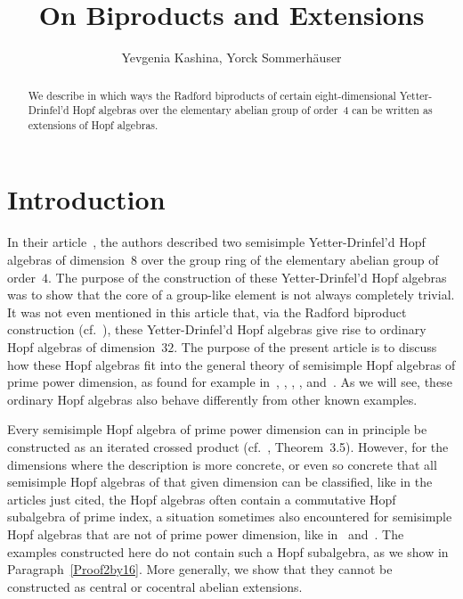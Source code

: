 \documentclass{article}
\title{On Biproducts and Extensions}
\author{Yevgenia Kashina, Yorck Sommerh\"auser}
\date{}
\numberwithin{equation}{section}
\theoremstyle{definition}
\theoremstyle{break}
\newcommand{\1}{{(1)}}
\newcommand{\2}{{(2)}}
\newcommand{\3}{{(3)}}
\begin{document}
\maketitle

\begin{abstract}
\noindent
We describe in which ways the Radford biproducts of certain eight-dimen\-sional Yetter-Drinfel'd Hopf algebras over the elementary abelian group of order~$4$ can be written as extensions of Hopf algebras.
\end{abstract}



\section*{Introduction} \label{Sec:Introd}
In their article~\cite{KaSo2}, the authors described two semisimple Yetter-Drinfel'd Hopf algebras of dimension~$8$ over the group ring of the elementary abelian group of order~$4$. The purpose of the construction of these Yetter-Drinfel'd Hopf algebras was to show that the core of a group-like element is not always completely trivial. It was not even mentioned in this article that, via the Radford biproduct construction (cf.~\cite{RadfProj}), these Yetter-Drinfel'd Hopf algebras give rise to ordinary Hopf algebras of dimension~$32$. The purpose of the present article is to discuss how these Hopf algebras fit into the general theory of semisimple Hopf algebras of prime power dimension, as found for example in~\cite{Ka}, \cite{Ka2}, \cite{Ka3}, \cite{Ma1}, and~\cite{Ma2}. As we will see, these ordinary Hopf algebras also behave differently from other known examples.

Every semisimple Hopf algebra of prime power dimension can in principle be constructed as an iterated crossed product (cf.~\cite{MW}, Theorem~3.5). However, for the dimensions where the description is more concrete, or even so concrete that all semisimple Hopf algebras of that given dimension can be classified, like in the articles just cited, the Hopf algebras often contain a commutative Hopf subalgebra of prime index, a situation sometimes also encountered for semisimple Hopf algebras that are not of prime power dimension, like in~\cite{Ma3} and~\cite{Na1}. The examples constructed here do not contain such a Hopf subalgebra, as we show in Paragraph~\ref{Proof2by16}. More generally, we show that they cannot be constructed as central or cocentral abelian extensions.
\end{document}
